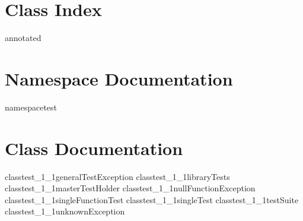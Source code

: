 
	
	\chapter{Class Index}
		{annotated}
	\chapter{Namespace Documentation}
		{namespacetest}
		
	\chapter{Class Documentation}
		{classtest_1_1generalTestException}
		{classtest_1_1libraryTests}
		{classtest_1_1masterTestHolder}
		{classtest_1_1nullFunctionException}
		{classtest_1_1singleFunctionTest}
		{classtest_1_1singleTest}
		{classtest_1_1testSuite}
		{classtest_1_1unknownException}
		